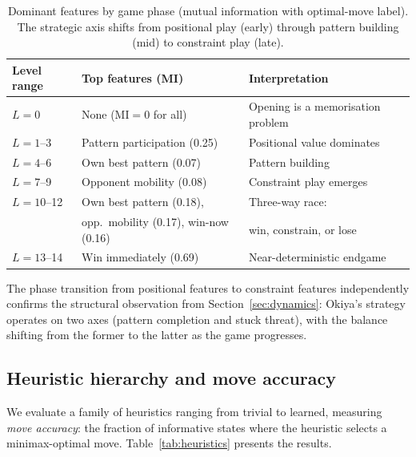 \documentclass[11pt,a4paper]{article}
\begin{document}
\begin{table}[t]
\centering
\caption{Dominant features by game phase (mutual information with
  optimal-move label).  The strategic axis shifts from positional play
  (early) through pattern building (mid) to constraint play (late).}
\label{tab:mi}
\begin{tabular}{@{}lll@{}}
\toprule
Level range & Top features (MI) & Interpretation\\
\midrule
$L{=}0$    & None (MI${=}0$ for all) & Opening is a memorisation problem\\
$L{=}1$--3 & Pattern participation (0.25) & Positional value dominates\\
$L{=}4$--6 & Own best pattern (0.07) & Pattern building\\
$L{=}7$--9 & Opponent mobility (0.08) & Constraint play emerges\\
$L{=}10$--12 & Own best pattern (0.18), & Three-way race:\\
             & opp.\ mobility (0.17), win-now (0.16) & win, constrain, or lose\\
$L{=}13$--14 & Win immediately (0.69) & Near-deterministic endgame\\
\bottomrule
\end{tabular}
\end{table}

The phase transition from positional features to constraint features
independently confirms the structural observation from
Section~\ref{sec:dynamics}: Okiya's strategy operates on two axes
(pattern completion and stuck threat), with the balance shifting from
the former to the latter as the game progresses.

\subsection{Heuristic hierarchy and move accuracy}

We evaluate a family of heuristics ranging from trivial to learned,
measuring \emph{move accuracy}: the fraction of informative states where
the heuristic selects a minimax-optimal move.
Table~\ref{tab:heuristics} presents the results.
\end{document}
